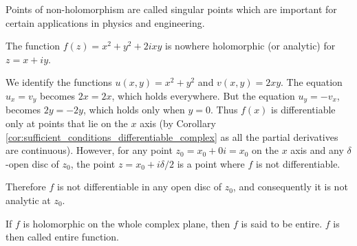 \begin{remark}
Points of non-holomorphism are called singular points which are important for certain applications in physics and engineering.
\end{remark}

\begin{example}
The function $f(z) = x^2 + y^2 + 2ixy$ is nowhere holomorphic (or analytic) for $z = x+ iy$.

We identify the functions $u(x,y) = x^2 + y^2$ and $v(x,y) = 2xy$. The equation $u_x = v_y$ becomes $2x = 2x$, which holds everywhere. But the equation $u_y = -v_x$, becomes $2y = -2y$, which holds only when $y=0$. Thus $f(x)$ is differentiable only at points that lie on the $x$ axis (by Corollary \ref{cor:sufficient_conditions_differentiable_complex} as all the partial derivatives are continuous). However, for any point $z_0 = x_0 + 0i = x_0$ on the $x$ axis and any $\delta$-open disc of $z_0$, the point $z = x_0 + i\delta/2$ is a point where $f$ is not differentiable. 

Therefore $f$ is not differentiable in any open disc of $z_0$, and consequently it is not analytic at $z_0$.
\end{example}

\begin{definition}
If $f$ is holomorphic on the whole complex plane, then $f$ is said to be entire. $f$ is then called entire function.
\end{definition}







